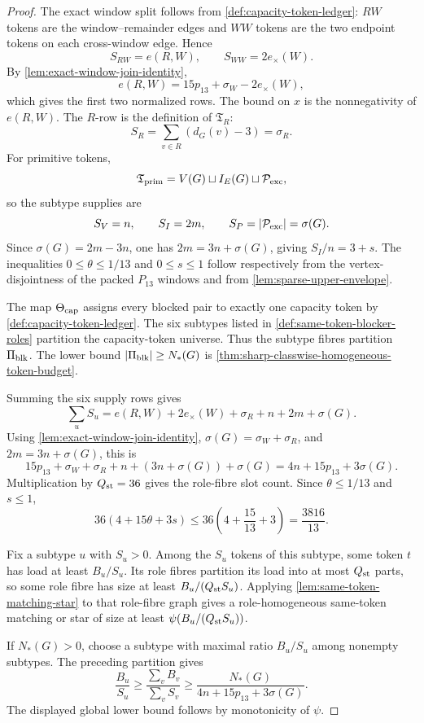 \documentclass[11pt]{article}
\begin{document}
\begin{proof}
The exact window split follows from \cref{def:capacity-token-ledger}: \(RW\)
tokens are the window--remainder edges and \(WW\) tokens are the two endpoint
tokens on each cross-window edge.  Hence
\[
S_{RW}=e(R,W),\qquad S_{WW}=2e_\times(W).
\]
By \cref{lem:exact-window-join-identity},
\[
e(R,W)=15p_{13}+\sigma_W-2e_\times(W),
\]
which gives the first two normalized rows.  The bound on \(x\) is the
nonnegativity of \(e(R,W)\).  The \(R\)-row is the definition of
\(\mathfrak T_R\):
\[
S_R=\sum_{v\in R}(d_G(v)-3)=\sigma_R.
\]
For primitive tokens,
\[
\mathfrak T_{\rm prim}=V(G)\sqcup I_E(G)\sqcup\mathcal P_{\rm exc},
\]
so the subtype supplies are
\[
S_V=n,\qquad S_I=2m,\qquad S_P=|\mathcal P_{\rm exc}|=\sigma(G).
\]
Since \(\sigma(G)=2m-3n\), one has \(2m=3n+\sigma(G)\), giving
\(S_I/n=3+s\).  The inequalities \(0\le\theta\le1/13\) and \(0\le s\le1\)
follow respectively from the vertex-disjointness of the packed \(P_{13}\)
windows and from \cref{lem:sparse-upper-envelope}.

The map \(\Theta_{\rm cap}\) assigns every blocked pair to exactly one capacity
token by \cref{def:capacity-token-ledger}.  The six subtypes listed in
\cref{def:same-token-blocker-roles} partition the capacity-token universe.
Thus the subtype fibres partition \(\Pi_{\rm blk}\).  The lower bound
\(|\Pi_{\rm blk}|\ge N_*(G)\) is
\cref{thm:sharp-classwise-homogeneous-token-budget}.

Summing the six supply rows gives
\[
\sum_uS_u
=e(R,W)+2e_\times(W)+\sigma_R+n+2m+\sigma(G).
\]
Using \cref{lem:exact-window-join-identity}, \(\sigma(G)=\sigma_W+\sigma_R\),
and \(2m=3n+\sigma(G)\), this is
\[
15p_{13}+\sigma_W+\sigma_R+n+(3n+\sigma(G))+\sigma(G)
=4n+15p_{13}+3\sigma(G).
\]
Multiplication by \(Q_{\rm st}=36\) gives the role-fibre slot count.  Since
\(\theta\le1/13\) and \(s\le1\),
\[
36(4+15\theta+3s)
\le36\left(4+\frac{15}{13}+3\right)
=\frac{3816}{13}.
\]

Fix a subtype \(u\) with \(S_u>0\).  Among the \(S_u\) tokens of this subtype,
some token \(t\) has load at least \(B_u/S_u\).  Its role fibres partition its
load into at most \(Q_{\rm st}\) parts, so some role fibre has size at least
\(B_u/(Q_{\rm st}S_u)\).  Applying
\cref{lem:same-token-matching-star} to that role-fibre graph gives a
role-homogeneous same-token matching or star of size at least
\(\psi(B_u/(Q_{\rm st}S_u))\).

If \(N_*(G)>0\), choose a subtype with maximal ratio \(B_u/S_u\) among nonempty
subtypes.  The preceding partition gives
\[
\frac{B_u}{S_u}
\ge
\frac{\sum_vB_v}{\sum_vS_v}
\ge
\frac{N_*(G)}{4n+15p_{13}+3\sigma(G)}.
\]
The displayed global lower bound follows by monotonicity of \(\psi\).
\end{proof}
\end{document}
